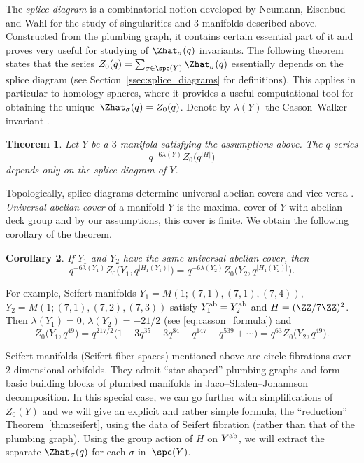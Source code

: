 \documentclass[pdftex]{sigma}
\newtheorem{Theorem}{Theorem}[section]
\newtheorem{Corollary}[Theorem]{Corollary}
\begin{document}
The \emph{splice diagram} is a combinatorial notion developed by Neumann, Eisenbud and Wahl \mbox{\cite{EN86, NW05a}} for the study of singularities and 3-manifolds described above. Constructed from the plumbing graph, it contains certain essential part of it and proves very useful for studying of $\Zhat_\sigma(q)$ invariants. The following theorem states that the series $Z_0(q) = \sum_{\sigma \in \spc(Y)}{\Zhat_\sigma(q)}$ essentially depends on the splice diagram (see Section~\ref{ssec:splice_diagrams} for definitions). This applies in particular to homology spheres, where it provides a useful computational tool for obtaining the unique~${\Zhat_\sigma(q) = Z_0(q)}$. Denote by $\lambda(Y)$ the Casson--Walker invariant \cite{Wa92}.

\begin{Theorem}
	Let $Y$ be a $3$-manifold satisfying the assumptions above. The $q$-series
	\begin{equation}
		q^{-6 \lambda(Y)} Z_{0}\bigl(q^{|H|}\bigr)
	\end{equation}
	depends only on the splice diagram of $Y$.
\end{Theorem}

Topologically, splice diagrams determine universal abelian covers and vice versa \cite{NW05a, Pe09}. \emph{Universal abelian cover} of a manifold $Y$ is the maximal cover of $Y$ with abelian deck group and by our assumptions, this cover is finite. We obtain the following corollary of the theorem.

\begin{Corollary}
	If $Y_1$ and $Y_2$ have the same universal abelian cover, then
	\[
		q^{-6 \lambda(Y_1)} Z_0\bigl(Y_1, q^{|H_1(Y_1)|}\bigr) =
		q^{-6 \lambda(Y_2)} Z_0\bigl(Y_2, q^{|H_1(Y_2)|}\bigr).
	\]
\end{Corollary}
For example, Seifert manifolds $Y_1 = M(1;(7,1),(7,1),(7,4))$, $Y_2 = M(1;(7,1),(7,2),(7,3))$ satisfy $Y_1^{\rm ab}=Y_2^{\rm ab}$ and $H=(\ZZ/7\ZZ)^2$. Then $\lambda(Y_1)=0$, $\lambda(Y_2)=-21/2$ (see \eqref{eq:casson_formula}) and
\[
	Z_0\bigl(Y_1,q^{49}\bigr) = q^{217/2} \bigl(1 - 3 q^{35} + 3 q^{84} - q^{147} + q^{539} +\cdots\bigr) = q^{63} Z_0\bigl(Y_2,q^{49}\bigr).
\]

Seifert manifolds (Seifert fiber spaces) mentioned above are circle fibrations over 2-dimen\-sion\-al orbifolds. They admit ``star-shaped'' plumbing graphs and form basic building blocks of plumbed manifolds in Jaco--Shalen--Johannson decomposition. In this special case, we can go further with simplifications of $Z_0(Y)$ and we will give an explicit and rather simple formula, the ``reduction'' Theorem~\ref{thm:seifert}, using the data of Seifert fibration (rather than that of the plumbing graph). Using the group action of $H$ on $Y^{\rm ab}$, we will extract the separate $\Zhat_{\sigma}(q)$ for each
$\sigma$ in~$\spc(Y)$.
\end{document}
